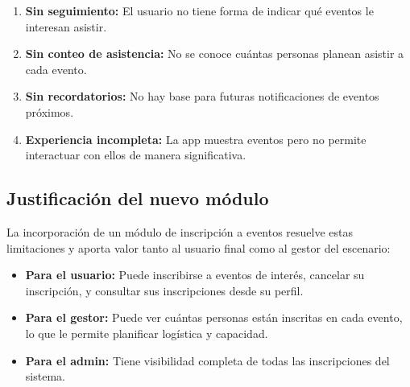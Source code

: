 \begin{enumerate}
  \item \textbf{Sin seguimiento:} El usuario no tiene forma de indicar
    qu\'e eventos le interesan asistir.
  \item \textbf{Sin conteo de asistencia:} No se conoce cu\'antas
    personas planean asistir a cada evento.
  \item \textbf{Sin recordatorios:} No hay base para futuras
    notificaciones de eventos pr\'oximos.
  \item \textbf{Experiencia incompleta:} La app muestra eventos pero
    no permite interactuar con ellos de manera significativa.
\end{enumerate}

\subsection{Justificaci\'on del nuevo m\'odulo}

La incorporaci\'on de un m\'odulo de inscripci\'on a eventos resuelve
estas limitaciones y aporta valor tanto al usuario final como al
gestor del escenario:

\begin{itemize}
  \item \textbf{Para el usuario:} Puede inscribirse a eventos de
    inter\'es, cancelar su inscripci\'on, y consultar sus inscripciones
    desde su perfil.
  \item \textbf{Para el gestor:} Puede ver cu\'antas personas est\'an
    inscritas en cada evento, lo que le permite planificar
    log\'istica y capacidad.
  \item \textbf{Para el admin:} Tiene visibilidad completa de todas las
    inscripciones del sistema.
\end{itemize}

